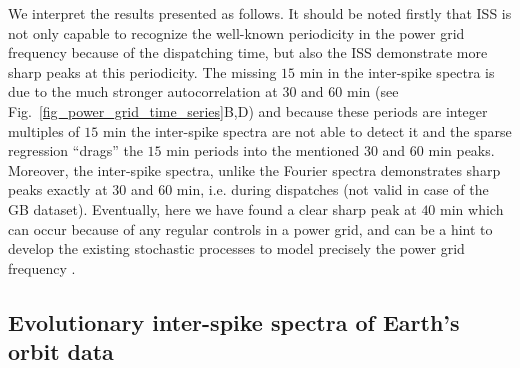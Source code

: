 \documentclass[entropy,article,submit,pdftex,moreauthors]{Definitions/mdpi}
\begin{document}
We interpret the results presented as follows. It should be noted firstly that ISS is not only capable to recognize the well-known periodicity in the power grid frequency because of the dispatching time, but also the ISS demonstrate more sharp peaks at this periodicity. The missing $15$ \si{min} in the inter-spike spectra is due to the much stronger autocorrelation at $30$ and $60$ \si{min} 
(see Fig.~\ref{fig_power_grid_time_series}B,D) and because these periods are integer multiples of $15$ \si{min} the inter-spike spectra are not able to detect it and the 
sparse regression ``drags'' the $15$ \si{min} periods into the mentioned $30$ and $60$ \si{min} peaks. Moreover, the inter-spike spectra, unlike the Fourier spectra demonstrates sharp peaks exactly 
at $30$ and $60$ \si{min}, i.e. during dispatches (not valid in case of the GB dataset). Eventually, here we have found a clear sharp peak at $40$ \si{min} which can occur 
because of any regular controls in a power grid, and can be a hint to develop the existing stochastic processes to model precisely the power grid frequency \cite{gorjao2020data}. 



\subsection{Evolutionary inter-spike spectra of Earth's orbit data}
\end{document}

